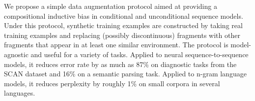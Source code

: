 We propose a simple data augmentation protocol aimed at providing a compositional inductive bias in conditional and unconditional sequence models. Under this protocol, synthetic training examples are constructed by taking real training examples and replacing (possibly discontinuous) fragments with other fragments that appear in at least one similar environment. The protocol is model-agnostic and useful for a variety of tasks. Applied to neural sequence-to-sequence models, it reduces error rate by as much as 87\% on diagnostic tasks from the SCAN dataset and 16\% on a semantic parsing task. Applied to n-gram language models, it reduces perplexity by roughly 1\% on small corpora in several languages.
